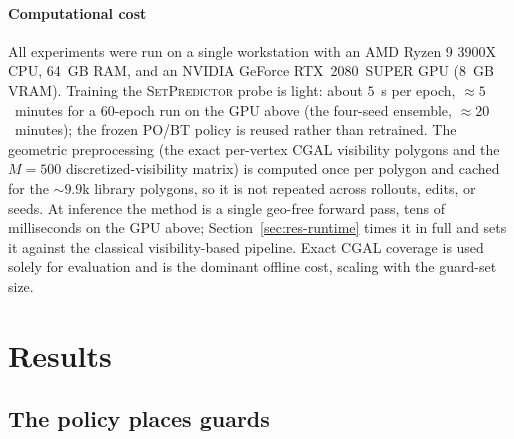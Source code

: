 \documentclass[11pt]{article}
\newcommand{\SetPredictor}{\textup{\textsc{SetPredictor}}}
\begin{document}
\paragraph{Computational cost} All experiments were run on a single workstation with an AMD Ryzen 9 3900X CPU, 64~GB RAM, and an NVIDIA GeForce RTX~2080~SUPER GPU (8~GB VRAM). Training the \SetPredictor{} probe is light: about $5$~s per epoch, $\approx 5$~minutes for a $60$-epoch run on the GPU above (the four-seed ensemble, $\approx 20$~minutes); the frozen PO/BT policy is reused rather than retrained. The geometric preprocessing (the exact per-vertex CGAL visibility polygons and the $M=500$ discretized-visibility matrix) is computed once per polygon and cached for the $\sim$$9.9$k library polygons, so it is not repeated across rollouts, edits, or seeds. At inference the method is a single geo-free forward pass, tens of milliseconds on the GPU above; Section~\ref{sec:res-runtime} times it in full and sets it against the classical visibility-based pipeline. Exact CGAL coverage is used solely for evaluation and is the dominant offline cost, scaling with the guard-set size.

\section{Results}
\label{sec:results}

\subsection{The policy places guards}
\label{sec:res-headline}

\begin{table}[!ht]
  \centering
  \footnotesize
  \caption{Held-out evaluation on \texttt{test} ($362$ polygons). Classical greedy is the only non-learned anchor. \emph{seed} is the PO/BT policy decoded greedily; \emph{LS on policy seed} is its local-search refinement, the \SetPredictor{}'s supervised target, not a classical baseline (Section~\ref{sec:exp-training}). \emph{\SetPredictor{} full} and \emph{no-encoder} are the headline probe and its zeroed-embedding ablation, mean $\pm$ std over four probe seeds at $t = 0.20$. At this common threshold the two probes sit at different operating points, so the gate counts are not an encoder comparison; Section~\ref{sec:res-headline-ablation} makes that at matched guard budget. Wilson $95\%$ CI shown only where the proportion is informative.}
  \label{tab:headline}
\end{table}
\end{document}
